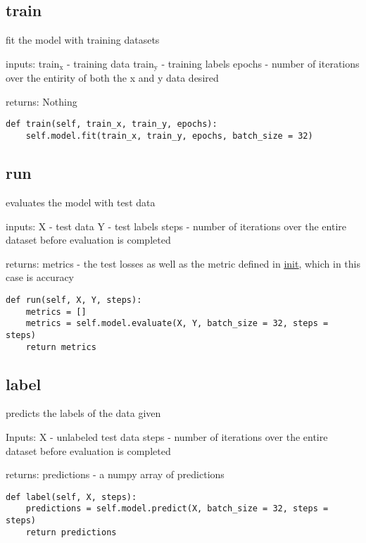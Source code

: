 \documentclass[11pt]{article}
\begin{document}
\subsection{train}
\label{sec:orgfd5027f}

fit the model with training datasets

inputs:
train\(_{\text{x}}\) - training data
train\(_{\text{y}}\) - training labels
epochs - number of iterations over the entirity of both the x and y data desired

returns:
Nothing

\begin{verbatim}
def train(self, train_x, train_y, epochs):
    self.model.fit(train_x, train_y, epochs, batch_size = 32)
\end{verbatim}

\subsection{run}
\label{sec:org9dbceb8}


evaluates the model with test data

inputs:
X - test data
Y - test labels
steps - number of iterations over the entire dataset before evaluation is completed

returns:
metrics - the test losses as well as the metric defined in \uline{\uline{init}}, which in this case is accuracy

\begin{verbatim}
def run(self, X, Y, steps):
    metrics = []
    metrics = self.model.evaluate(X, Y, batch_size = 32, steps = steps)
    return metrics
\end{verbatim}


\subsection{label}
\label{sec:orgbe00c18}

predicts the labels of the data given

Inputs:
X - unlabeled test data
steps - number of iterations over the entire dataset before evaluation is completed

returns:
predictions - a numpy array of predictions

\begin{verbatim}
def label(self, X, steps):
    predictions = self.model.predict(X, batch_size = 32, steps = steps)
    return predictions
\end{verbatim}
\end{document}

